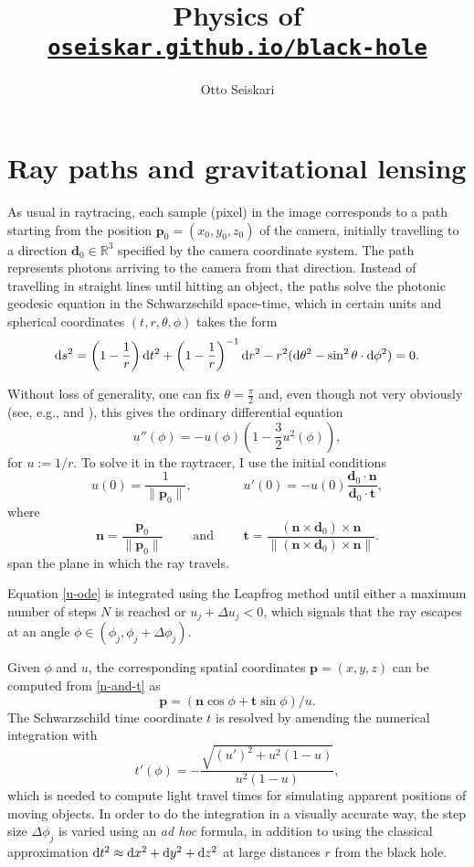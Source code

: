 \documentclass[a4paper,12pt]{article}
\title{Physics of \href{https://oseiskar.github.io/black-hole}{\tt oseiskar.github.io/black-hole}}
\author{Otto Seiskari}
\date{}
\def\mb{\boldsymbol}
\def\d{{\rm d}}
\begin{document}
\maketitle

\section*{Ray paths and gravitational lensing}

As usual in raytracing, each sample (pixel) in the image corresponds to a path starting from the position $\mb p_0 = (x_0, y_0, z_0)$ of the camera, initially travelling to a direction $\mb d_0 \in \mathbb R^3$ specified by the camera coordinate system. The path represents photons arriving to the camera from that direction. 
Instead of travelling in straight lines until hitting an object, the paths solve the photonic geodesic equation in the Schwarzschild space-time, which in certain units and spherical coordinates $(t,r,\theta,\phi)$ takes the form
$$
%
    \d s^2 = \left(1-\frac1r\right)\d t^2 + \left(1-\frac1r\right)^{-1} \d r^2 - r^2(\d \theta^2-\sin^2\theta \cdot \d \phi^2) = 0.
$$

Without loss of generality, one can fix $\theta = \frac\pi2$ and, even though not very obviously (see, e.g., \cite{wikipedia:sch} and \cite{antonell}), this gives the ordinary differential equation
\begin{equation}\label{u-ode}
    u''(\phi) = -u(\phi) \left(1-\frac32u^2(\phi)\right),
\end{equation}
for $u := 1/r$.
To solve it in the raytracer, I use the initial conditions
\def\n{\mb n}
\def\p{\mb p_0}
\def\v{\mb v}
\def\t{\mb t}
\def\bd{\mb d_0}
$$
%
    u(0) = \frac1{\|\p\|}, \qquad \qquad
    u'(0) = -u(0) \frac{\bd \cdot \n}{\bd \cdot \t},
$$
where
\begin{equation}\label{n-and-t}
    \n = \frac{\p}{\|\p\|}
    \qquad \mbox{ and } \qquad
    \t = \frac{(\n \times \bd) \times \n}{\|(\n \times \bd) \times \n\|}.
\end{equation}
span the plane in which the ray travels.

Equation \eqref{u-ode} is integrated using the Leapfrog method until either a maximum number of steps $N$ is reached or $u_j + \Delta u_j < 0$, which signals that the ray escapes at an angle $\phi \in (\phi_j, \phi_j + \Delta \phi_j)$.

Given $\phi$ and $u$, the corresponding spatial coordinates $\mb p = (x,y,z)$ can be computed from \eqref{n-and-t} as
$$
  \mb p = \left( \n \cos \phi  + \t \sin \phi\right) / u.
$$
The Schwarzschild time coordinate $t$ is resolved by amending the numerical integration with
$$
 t'(\phi) = -\frac{\sqrt{(u')^2 + u^2(1-u)}}{u^2(1-u)},
$$
which is needed to compute light travel times for simulating apparent positions of moving objects.
In order to do the integration in a visually accurate way, the step size $\Delta \phi_j$ is varied using an \emph{ad hoc} formula, %
in addition to using the classical approximation $\d t^2 \approx \d x^2 + \d y^2 + \d z^2$ at large distances $r$ from the black hole.
\end{document}
